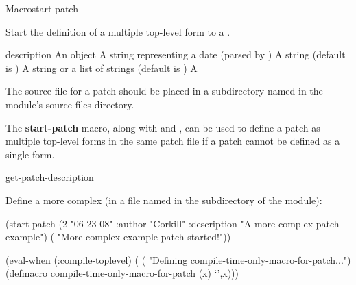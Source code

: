 \documentclass[10pt,twoside,english,pdftex]{article}
\begin{document}
\begin{functiondoc}{Macro}{start-patch}%
  {\code{(}
     \code{)}
    \superstar} 
%
%

\fnsyntax 

\fnpurpose Start the definition of a multiple top-level form  to
a .

\fnpackage {}

\fnmodule {}

\fnargs
\begin{args}{description}
\arg[id] An object
\arg[date] A string representing a date (parsed by 
  )
\arg[author] A string (default is )
\arg[description] A string or a list of strings (default is \nil)
\arg[form] A 
\end{args}

\fndescription 
%
The source file for a patch should be placed in a subdirectory named
 in the module's source-files directory.

The \textbf{start-patch} macro, along with
 and
, can be used to define a patch as
multiple top-level forms in the same patch file if a patch cannot be defined
as a single  form.

\begin{alsos}{get-patch-description}
\also[patch]
\also[undefmethod]
\end{alsos}

\fnexample 
%
Define a more complex  (in a file named
 in the  subdirectory of
the module):
%
%
%
%
%
\W\supp
\begin{example}
  (start-patch (2 "06-23-08" 
                  :author "Corkill"
                  :description "A more complex patch example")
      ( "More complex example patch started!"))

  (eval-when (:compile-toplevel)
    (
     ( "Defining compile-time-only-macro-for-patch...")
     (defmacro compile-time-only-macro-for-patch (x)
       `',x)))


\end{example}
\end{functiondoc}
\end{document}
